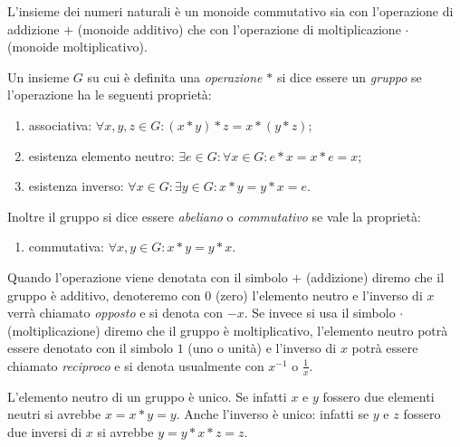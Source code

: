   \begin{example}
  L'insieme dei numeri naturali è un monoide commutativo sia con l'operazione di addizione $+$ 
  (monoide additivo) che con l'operazione di moltiplicazione 
  $\cdot$ (monoide moltiplicativo).
  \end{example}
  
  \begin{definition}[gruppo]
  \label{def:gruppo}%
  Un insieme $G$ su cui è definita una \emph{operazione} $*$ 
  si dice essere un \emph{gruppo}%
%
 se l'operazione
  ha le seguenti proprietà:
  \begin{enumerate}
    \item associativa: $\forall x,y,z\in G\colon (x*y)*z = x*(y*z)$;
    \item esistenza elemento neutro: 
    $\exists e\in G\colon \forall x\in G \colon e*x=x*e = x$;
    \item esistenza inverso: 
    $\forall x\in G\colon \exists y\in G\colon x*y=y*x=e$.
  \end{enumerate}
  Inoltre il gruppo si dice essere \emph{abeliano}%
%
 o \emph{commutativo}
  se vale la proprietà:
  \begin{enumerate}
    \item[4.] commutativa: $\forall x,y\in G\colon x*y = y*x$.
  \end{enumerate}
  
  Quando l'operazione viene denotata con il simbolo $+$ (addizione)
  diremo che il gruppo è additivo, denoteremo con $0$ 
  (zero) l'elemento neutro e l'inverso di $x$ verrà chiamato \emph{opposto}
  e si denota con $-x$.
  Se invece si usa il simbolo $\cdot$ (moltiplicazione)
  diremo che il gruppo è moltiplicativo, l'elemento neutro potrà 
  essere denotato con il simbolo $1$ (uno o unità) e 
  l'inverso di $x$ potrà essere chiamato \emph{reciproco}
  e si denota usualmente con $x^{-1}$ o $\frac 1 x$.
\end{definition}
  
L'elemento neutro di un gruppo è unico. 
Se infatti $x$ e $y$ fossero due elementi neutri 
si avrebbe $x = x*y = y$. 
Anche l'inverso è unico: infatti se $y$ e $z$ fossero 
due inversi di $x$ si avrebbe $y = y * x * z = z$.

